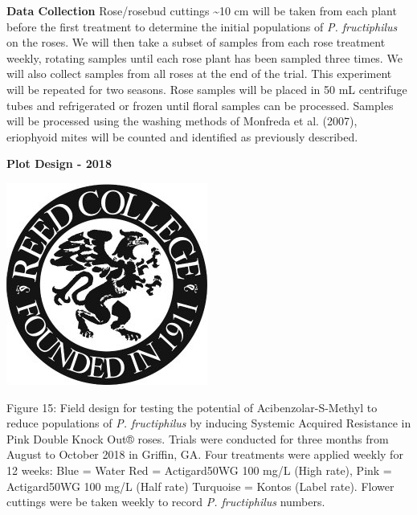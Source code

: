 \documentclass[12pt,final,CPage]{ufthesis}
\begin{document}
{  \textbf{Data Collection}
  Rose/rosebud cuttings \textasciitilde10 cm will be taken from each plant before the first treatment to determine the initial populations of \emph{P. fructiphilus} on the roses. We will then take a subset of samples from each rose treatment weekly, rotating samples until each rose plant has been sampled three times. We will also collect samples from all roses at the end of the trial. This experiment will be repeated for two seasons. Rose samples will be placed in 50 mL centrifuge tubes and refrigerated or frozen until floral samples can be processed. Samples will be processed using the washing methods of Monfreda et al. (2007), eriophyoid mites will be counted and identified as previously described.

  \textbf{Plot Design - 2018}
  \begin{center}\includegraphics[width=0.8\linewidth]{figure/reed} \end{center}

  Figure 15: Field design for testing the potential of Acibenzolar-S-Methyl to reduce populations of \emph{P. fructiphilus} by inducing Systemic Acquired Resistance in Pink Double Knock Out® roses. Trials were conducted for three months from August to October 2018 in Griffin, GA. Four treatments were applied weekly for 12 weeks: Blue = Water Red = Actigard50WG 100 mg/L (High rate), Pink = Actigard50WG 100 mg/L (Half rate) Turquoise = Kontos (Label rate). Flower cuttings were be taken weekly to record \emph{P. fructiphilus} numbers.

}
\end{document}
